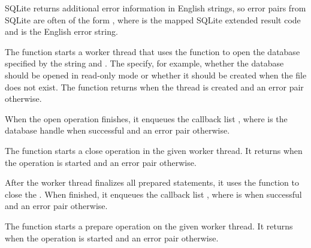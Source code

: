 SQLite returns additional error information in English strings, so
error pairs from SQLite are often of the form , where  is the mapped
SQLite extended result code and  is the English error
string.

\begin{function}
\end{function}

The  function starts a worker thread that
uses the  function to open the database
specified by the  string and . The
 specify, for example, whether the database should be
opened in read-only mode or whether it should be created when the file
does not exist. The function returns  when the thread is
created and an error pair otherwise.

When the open operation finishes, it enqueues the callback list
, where  is the
database handle when successful and an error pair otherwise.

\begin{function}
\end{function}

The  function starts a close operation in
the given  worker thread. It returns  when the
operation is started and an error pair otherwise.

After the worker thread finalizes all prepared statements, it uses the
 function to close the . When
finished, it enqueues the callback list , where  is  when successful and
an error pair otherwise.

\begin{function}
\end{function}

The  function starts a prepare operation
on the given  worker thread. It returns  when
the operation is started and an error pair otherwise.

